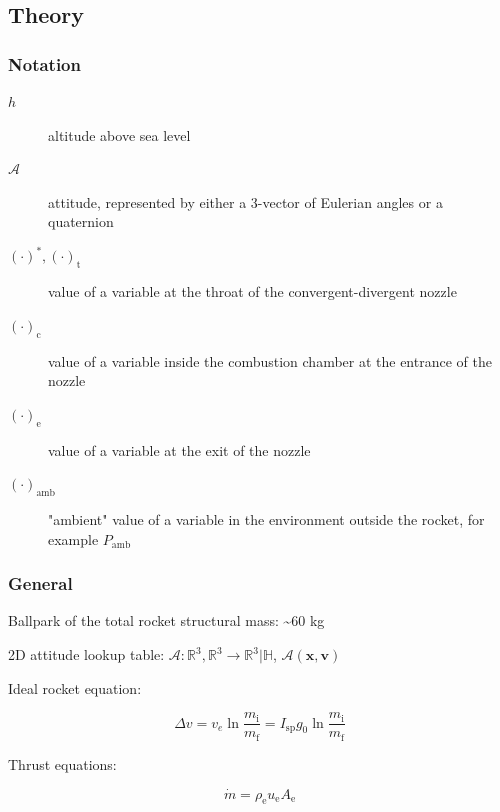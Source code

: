 \documentclass[fleqn]{article}
\begin{document}
\subsection{Theory}
\label{sec:orgada64df}

\subsubsection{Notation}
\label{sec:org6c0fbe4}

\begin{description}
\item[{\(h\)}] altitude above sea level

\item[{\(\mathcal A\)}] attitude, represented by either a 3-vector of Eulerian angles
or a quaternion

\item[{\((\cdot)^*, (\cdot)_\text{t}\)}] value of a variable at the throat of the
convergent-divergent nozzle

\item[{\((\cdot)_\text{c}\)}] value of a variable inside the combustion chamber at the
entrance of the nozzle

\item[{\((\cdot)_\text{e}\)}] value of a variable at the exit of the nozzle

\item[{\((\cdot)_\text{amb}\)}] "ambient" value of a variable in the environment
outside the rocket, for example \(P_\text{amb}\)
\end{description}
\subsubsection{General}
\label{sec:orgb8052a9}

Ballpark of the total rocket structural mass: \textasciitilde{}60 kg

2D attitude lookup table:
\(\mathcal A : \mathbb R^3, \mathbb R^3 \to \mathbb R^3 | \mathbb H\),
\(\mathcal A(\mathbf x, \mathbf v)\)

Ideal rocket equation:

\begin{equation*}
\Delta v
= v_e \ln\frac{m_\text{i}}{m_\text{f}}
= I_\text{sp} g_0 \ln\frac{m_\text{i}}{m_\text{f}}
\end{equation*}

Thrust equations:

\begin{equation*}
\dot{m} = \rho_\text{e} u_\text{e} A_\text{e}
\end{equation*}
\end{document}
